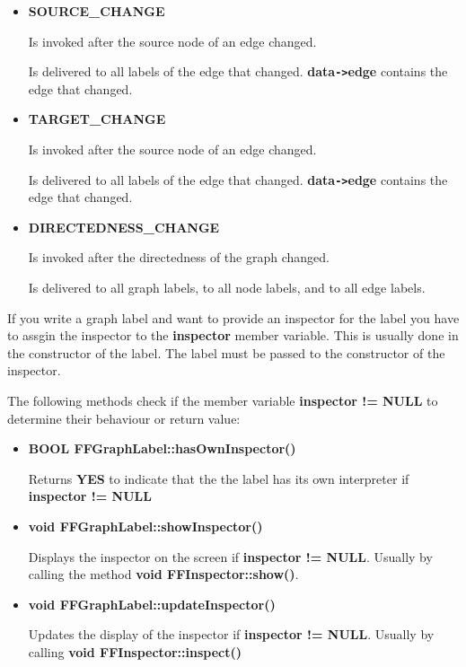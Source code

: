 \begin{itemize}
\begin{itemize}
  Is invoked before an graph label will be removed from the
  graph.
  
  Is delivered to all graph labels, to all node labels, and to all
  edge labels, including the one that will be removed. {\bf
    data\verb|->|index} contains the index of the label that will
  be removed.

\item{\bf SOURCE\_CHANGE}
  
  Is invoked after the source node of an edge changed.
  
  Is delivered to all labels of the edge that changed. {\bf
    data\verb|->|edge} contains the edge that changed.

\item{\bf TARGET\_CHANGE}
  
  Is invoked after the source node of an edge changed.
  
  Is delivered to all labels of the edge that changed. {\bf
    data\verb|->|edge} contains the edge that changed.

\item{\bf DIRECTEDNESS\_CHANGE}
  
  Is invoked after the directedness of the graph changed.
  
  Is delivered to all graph labels, to all node labels, and to all
  edge labels.

\end{itemize}

\end{itemize}

If you write a graph label and want to provide an inspector for the
label you have to assgin the inspector to the {\bf inspector}
member variable. This is usually done in the constructor of the label.
The label must be passed to the constructor of the inspector.

The following methods check if the member variable {\bf inspector !=
NULL} to determine their behaviour or return value:

\begin{itemize}

\item{\bf BOOL FFGraphLabel::hasOwnInspector()}

Returns {\bf YES} to indicate that the the label has its own
interpreter if {\bf inspector != NULL}

\item{\bf void FFGraphLabel::showInspector()}

Displays the inspector on the screen if {\bf inspector !=
NULL}. Usually by calling the method {\bf void FFInspector::show()}.

\item{\bf void FFGraphLabel::updateInspector()}

Updates the display of the inspector if {\bf inspector !=
NULL}. Usually by calling {\bf void FFInspector::inspect()}

\end{itemize}
